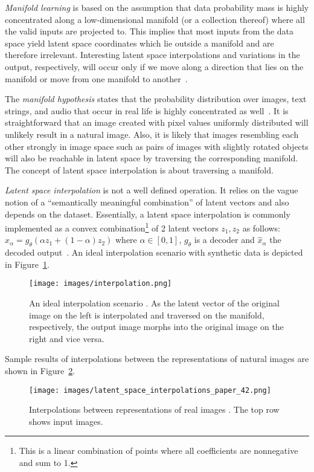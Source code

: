 \documentclass[a4paper,12pt]{report}
\begin{document}
\textit{Manifold learning} is based on the assumption that data probability mass is highly concentrated along a low-dimensional manifold (or a collection thereof) where all the valid inputs are projected to. This implies that most inputs from the data space yield latent space coordinates which lie outside a manifold and are therefore irrelevant. Interesting latent space interpolations and variations in the output, respectively, will occur only if we move along a direction that lies on the manifold or move from one manifold to another~\cite{DeepLearningBook}.

The \textit{manifold hypothesis} states that the probability distribution over images, text strings, and audio that occur in real life is highly concentrated as well~\cite{ReprLearning}. It is straightforward that an image created with pixel values uniformly distributed will unlikely result in a natural image. Also, it is likely that images resembling each other strongly in image space such as pairs of images with slightly rotated objects will also be reachable in latent space by traversing the corresponding manifold. The concept of latent space interpolation is about traversing a manifold.

\textit{Latent space interpolation} is not a well defined operation. It relies on the vague notion of a ``semantically meaningful combination'' of latent vectors and also depends on the dataset. Essentially, a latent space interpolation is commonly implemented as a convex combination\footnote{This is a linear combination of points where all coefficients are nonnegative and sum to 1.} of 2 latent vectors $z_1, z_2$ as follows: $\hat{x}_{\alpha} = g_{\theta}(\alpha z_1+(1-\alpha)z_2)$ where $\alpha \in [0,1]$, $g_{\theta}$ is a decoder and $\hat{x}_{\alpha}$ the decoded output~\cite{AE_Interp}. An ideal interpolation scenario with synthetic data is depicted in Figure~\ref{fig:interpolation_ideal}.
\begin{figure}[ht]
\centering
\texttt{[image: images/interpolation.png]}
\caption{An ideal interpolation scenario \cite{InkscapeInterpolation}. As the latent vector of the original image on the left is interpolated and traversed on the manifold, respectively, the output image morphs into the original image on the right and vice versa.}
\label{fig:interpolation_ideal}
\end{figure}

Sample results of interpolations between the representations of natural images are shown in Figure~\ref{fig:interpolation_real}.
\begin{figure}[ht]
\centering
\texttt{[image: images/latent\_space\_interpolations\_paper\_42.png]}
\caption{Interpolations between representations of real images \cite{InterpolExamples}. The top row shows input images.}
\label{fig:interpolation_real}
\end{figure}
\end{document}
